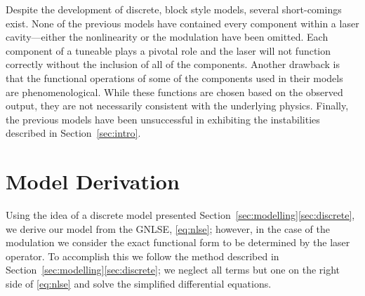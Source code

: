 \documentclass[9pt,twocolumn,twoside]{osajnl}
\begin{document}
Despite the development of discrete, block style models, several short-comings exist. None of the previous models have contained every component within a laser cavity---either the nonlinearity or the modulation have been omitted. Each component of a tuneable plays a pivotal role and the laser will not function correctly without the inclusion of all of the components. Another drawback is that the functional operations of some of the components used in their models are phenomenological. While these functions are chosen based on the observed output, they are not necessarily consistent with the underlying physics. Finally, the previous models have been unsuccessful in exhibiting the instabilities described in Section~\ref{sec:intro}.

\section{Model Derivation}
\label{sec:model}
Using the idea of a discrete model presented Section~\ref{sec:modelling}\ref{sec:discrete}, we derive our model from the GNLSE, \eqref{eq:nlse}; however, in the case of the modulation we consider the exact functional form to be determined by the laser operator. To accomplish this we follow the method described in Section~\ref{sec:modelling}\ref{sec:discrete}; we neglect all terms but one on the right side of \eqref{eq:nlse} and solve the simplified differential equations.
\end{document}
